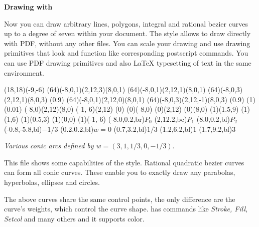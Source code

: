 

\def\bf{\textbf}
\def\it{\textit}
\def\tt{\texttt}



\begin{center}
{\Huge \bf{Drawing with \pdfTeX} \bigskip}
\end{center}

Now you can draw arbitrary lines, polygons, integral and rational bezier
curves up to a degree of seven within your \pdfTeX{} document. The \Lapdf{}
style allows to draw directly with PDF, without any other files. You can
scale your drawing and use drawing primitives that look and function like
corresponding postscript commands. You can use PDF drawing primitives and
also \LaTeX{} typesetting of text in the same environment.

\begin{center}
\begin{lapdf}(18,18)(-9,-6)
 \Red
 \Rcurve(64)(-8,0,1)(2,12,3)(8,0,1) \Stroke
 \Green
 \Rcurve(64)(-8,0,1)(2,12,1)(8,0,1) \Stroke
 \Blue
 \Rcurve(64)(-8,0,3)(2,12,1)(8,0,3) \Gfill(0.9)
 \Dgray
 \Rcurve(64)(-8,0,1)(2,12,0)(8,0,1) \Stroke
 \Magenta
 \Rcurve(64)(-8,0,3)(2,12,-1)(8,0,3) \Gfill(0.9)
 \Dash(1)
 \Setwidth(0.01)
 \Black
 \Polygon(-8,0)(2,12)(8,0) \Stroke
 \Line(-1,-6)(2,12) \Stroke
 \Dash(0)
 \Point(0)(-8,0)
 \Point(0)(2,12)
 \Point(0)(8,0)
 \Point(1)(1.5,9)
 \Point(1)(1,6)
 \Point(1)(0.5,3)
 \Point(1)(0,0)
 \Point(1)(-1,-6)
 \Text(-8.0,0.2,br){$P_0$}
 \Text(2,12.2,bc){$P_1$}
 \Text(8.0,0.2,bl){$P_2$}
 \Text(-0.8,-5.8,bl){$-1/3$}
 \Text(0.2,0.2,bl){$w=0$}
 \Text(0.7,3.2,bl){$1/3$}
 \Text(1.2,6.2,bl){$1$}
 \Text(1.7,9.2,bl){$3$}
\end{lapdf}

\it{Various conic arcs defined by $w=(3,1,1/3,0,-1/3)$}.
\end{center}

This file shows some capabilities of the \Lapdf{} style. Rational quadratic
bezier curves can form all conic curves. These enable you to exactly draw any
parabolas, hyperbolas, ellipses and circles.

The above curves share the same control points, the only difference are the
curve's weights, which control the curve shape. \Lapdf{} has commands like
\it{Stroke, Fill, Setcol} and many others and it supports color.

